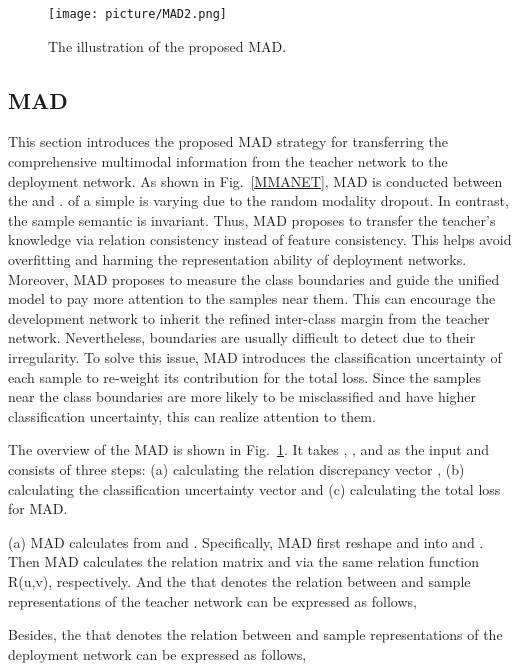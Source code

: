 \documentclass[10pt,twocolumn,letterpaper]{article}
\begin{document}
\begin{figure}[t]
\centering
\texttt{[image: picture/MAD2.png]} \caption{The illustration of the proposed MAD.}
\label{MAD}
\end{figure}


\subsection{MAD}

This section introduces the proposed MAD strategy for transferring the comprehensive multimodal information from the teacher network to the deployment network. As shown in Fig.~\ref{MMANET}, MAD is conducted between the  and .  of a simple is varying due to the random modality dropout. In contrast, the sample semantic is invariant. Thus, MAD proposes to transfer the teacher's knowledge via relation consistency instead of feature consistency. This helps avoid overfitting and harming the representation ability of deployment networks. Moreover, MAD proposes to measure the class boundaries and guide the unified model to pay more attention to the samples near them. This can encourage the development network to inherit the refined inter-class margin from the teacher network. Nevertheless, boundaries are usually difficult to detect due to their irregularity. To solve this issue, MAD introduces the classification uncertainty of each sample to re-weight its contribution for the total loss. Since the samples near the class boundaries are more likely to be misclassified and have higher classification uncertainty, this can realize attention to them. 


The overview of the MAD is shown in Fig.~\ref{MAD}. It takes , , and  as the input and consists of three steps: (a) calculating the relation discrepancy vector , (b) calculating the classification uncertainty vector  and (c) calculating the total loss  for MAD. 

(a) MAD calculates  from  and . Specifically, MAD first reshape  and  into  and . Then MAD calculates the relation matrix  and  via the same relation function R(u,v), respectively. And the  that denotes the relation between  and  sample representations of the teacher network can be expressed as follows,





Besides, the  that denotes the relation between  and  sample representations of the deployment network can be expressed as follows,
\end{document}

